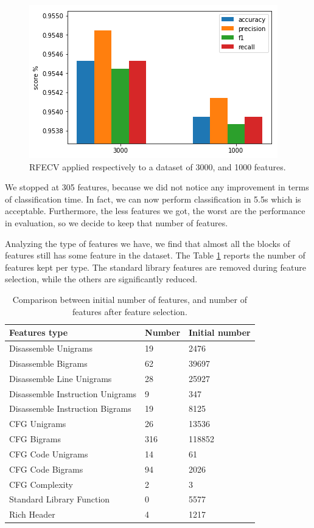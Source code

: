 \begin{figure}[]
	\centering
	\includegraphics[width=0.6\columnwidth]{rfecv-confronto.png}
	\caption{RFECV applied respectively to a dataset of 3000, and 1000 features.}
	\label{fig:rfecv-comparison}
\end{figure}

We stopped at 305 features, because we did not notice any improvement in terms of classification time. In fact, we can now perform classification in 5.5s which is acceptable. Furthermore, the less features we got, the worst are the performance in evaluation, so we decide to keep that number of features.

Analyzing the type of features we have, we find that almost all the blocks of features still has some feature in the dataset. The Table \ref{tab:num-feat-842} reports the number of features kept per type. The standard library features are removed during feature selection, while the others are significantly reduced.  

\begin{table}[]
	\caption{Comparison between initial number of features, and number of features after feature selection.}
	\label{tab:num-feat-842}
	\begin{tabular}{lll}
		\toprule
		Features type                    & Number & Initial number\\
		\midrule
		Disassemble Unigrams   &19 & 2476           \\
		Disassemble Bigrams    &62   & 39697          \\
		Disassemble Line Unigrams  &28& 25927          \\
		Disassemble Instruction Unigrams & 9 & 347   \\
		Disassemble Instruction Bigrams  & 19 & 8125    \\
		CFG Unigrams    &26 & 13536   \\
		CFG Bigrams      &316 & 118852  \\
		CFG Code Unigrams  & 14 & 61     \\
		CFG Code Bigrams   & 94 & 2026  \\
		CFG Complexity          & 2 & 3     \\
		Standard Library Function & 0 & 5577  \\
		Rich Header   & 4 & 1217  \\
		\bottomrule	
	\end{tabular}
\end{table}


